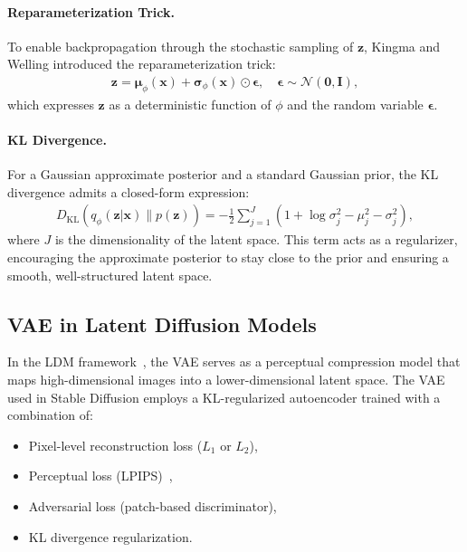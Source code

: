 \paragraph{Reparameterization Trick.}
To enable backpropagation through the stochastic sampling of $\mathbf{z}$, Kingma and Welling introduced the reparameterization trick:
\begin{align}
    \mathbf{z} = \boldsymbol{\mu}_\phi(\mathbf{x}) + \boldsymbol{\sigma}_\phi(\mathbf{x}) \odot \boldsymbol{\epsilon}, \quad \boldsymbol{\epsilon} \sim \mathcal{N}(\mathbf{0}, \mathbf{I}),
    \label{eq:reparam}
\end{align}
which expresses $\mathbf{z}$ as a deterministic function of $\phi$ and the random variable $\boldsymbol{\epsilon}$.

\paragraph{KL Divergence.}
For a Gaussian approximate posterior and a standard Gaussian prior, the KL divergence admits a closed-form expression:
\begin{align}
    D_{\text{KL}}\!\left(q_\phi(\mathbf{z}|\mathbf{x}) \| p(\mathbf{z})\right) = -\frac{1}{2}\sum_{j=1}^{J}\left(1 + \log \sigma_j^2 - \mu_j^2 - \sigma_j^2\right),
    \label{eq:kl_closed}
\end{align}
where $J$ is the dimensionality of the latent space. This term acts as a regularizer, encouraging the approximate posterior to stay close to the prior and ensuring a smooth, well-structured latent space.

\subsection{VAE in Latent Diffusion Models}
\label{subsec:vae_in_ldm}

In the LDM framework~\cite{rombach2022highresolution}, the VAE serves as a perceptual compression model that maps high-dimensional images into a lower-dimensional latent space. The VAE used in Stable Diffusion employs a KL-regularized autoencoder trained with a combination of:
\begin{itemize}
    \item Pixel-level reconstruction loss ($L_1$ or $L_2$),
    \item Perceptual loss (LPIPS)~\cite{zhang2018unreasonable},
    \item Adversarial loss (patch-based discriminator),
    \item KL divergence regularization.
\end{itemize}

